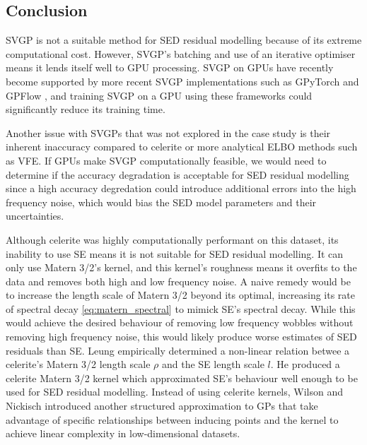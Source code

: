 \subsection{Conclusion}
SVGP is not a suitable method for SED residual modelling because of its extreme computational cost. However, SVGP's batching and use of an iterative optimiser means it lends itself well to GPU processing. SVGP on GPUs have recently become supported by more recent SVGP implementations such as GPyTorch \cite{gpytorch} and GPFlow \cite{gpflow}, and training SVGP on a GPU using these frameworks could significantly reduce its training time. 

Another issue with SVGPs that was not explored in the case study is their inherent inaccuracy compared to celerite or more analytical ELBO methods such as VFE. If GPUs make SVGP computationally feasible, we would need to determine if the accuracy degradation is acceptable for SED residual modelling since a high accuracy degredation could introduce additional errors into the high frequency noise, which would bias the SED model parameters and their uncertainties.

Although celerite was highly computationally performant on this dataset, its inability to use SE means it is not suitable for SED residual modelling. It can only use Matern 3/2's kernel, and this kernel's roughness means it overfits to the data and removes both high and low frequency noise. A naive remedy would be to increase the length scale of Matern 3/2 beyond its optimal, increasing its rate of spectral decay \ref{eq:matern_spectral} to mimick SE's spectral decay. While this would achieve the desired behaviour of removing low frequency wobbles without removing high frequency noise, this would likely produce worse estimates of SED residuals than SE. Leung \cite{galaxy-gp-noise} empirically determined a non-linear relation betwee a celerite's Matern 3/2 length scale $\rho$ and the SE length scale $l$. He produced a celerite Matern 3/2 kernel which approximated SE's behaviour well enough to be used for SED residual modelling. Instead of using celerite kernels, Wilson and Nickisch \cite{ski} introduced another structured approximation to GPs that take advantage of specific relationships between inducing points and the kernel to achieve linear complexity in low-dimensional datasets.


